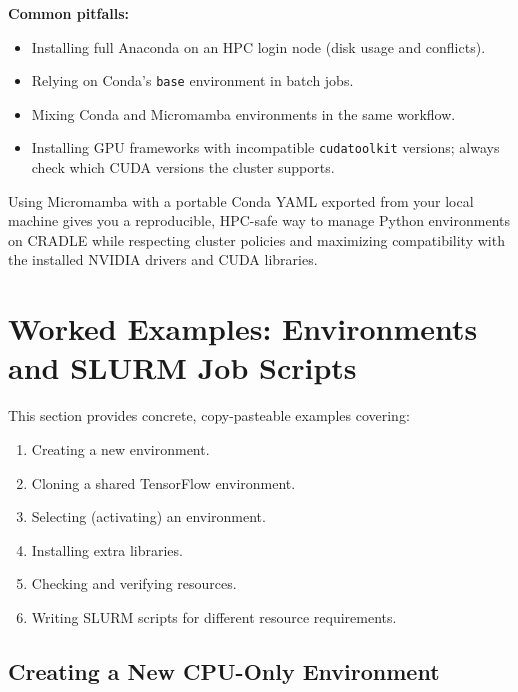 \documentclass[11pt]{article}
\begin{document}
\textbf{Common pitfalls:}
\begin{itemize}
  \item Installing full Anaconda on an HPC login node (disk usage and conflicts).
  \item Relying on Conda's \texttt{base} environment in batch jobs.
  \item Mixing Conda and Micromamba environments in the same workflow.
  \item Installing GPU frameworks with incompatible \texttt{cudatoolkit} versions;
        always check which CUDA versions the cluster supports.
\end{itemize}

Using Micromamba with a portable Conda YAML exported from your local machine
gives you a reproducible, HPC-safe way to manage Python environments on
CRADLE while respecting cluster policies and maximizing compatibility with
the installed NVIDIA drivers and CUDA libraries.

















\section{Worked Examples: Environments and SLURM Job Scripts}
\label{sec:examples}

This section provides concrete, copy-pasteable examples covering:
\begin{enumerate}
  \item Creating a new environment.
  \item Cloning a shared TensorFlow environment.
  \item Selecting (activating) an environment.
  \item Installing extra libraries.
  \item Checking and verifying resources.
  \item Writing SLURM scripts for different resource requirements.
\end{enumerate}


\subsection{Creating a New CPU-Only Environment}
\label{subsec:create-env-example}
\end{document}
